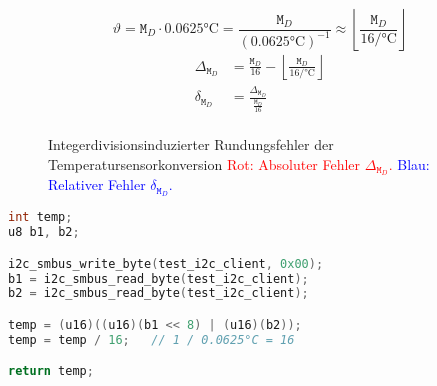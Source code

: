 \begin{equation}
    \vartheta = \texttt{M}_D \cdot 0.0625\si{\celsius} = \frac{\texttt{M}_D}{\left(0.0625\si{\celsius}\right)^{-1}} \approx \left\lfloor\frac{\texttt{M}_D}{16\si{\per\celsius}}\right\rfloor
    \label{eq:temp-convert}
\end{equation}
\begin{equation}
    \begin{aligned}
        \Delta_{\texttt{M}_D} &= \frac{\texttt{M}_D}{16} - \left\lfloor\frac{\texttt{M}_D}{16\si{\per\celsius}}\right\rfloor \\[2ex]
        \delta_{\texttt{M}_D} &= \frac{\Delta_{\texttt{M}_D}}{\frac{\texttt{M}_D}{16} } \\[2ex]
    \end{aligned}
    \label{eq:temp-error}
\end{equation}
\begin{figure}
    \centering
    \caption[Integerdivisionsinduzierter Rundungsfehler]{Integerdivisionsinduzierter Rundungsfehler der Temperatursensorkonversion
    \textcolor{red}{Rot: Absoluter Fehler $\Delta_{\texttt{M}_D}$.}
    \textcolor{blue}{Blau: Relativer Fehler $\delta_{\texttt{M}_D}$.}
    }
    \label{fig:rounding-err}
\end{figure}
\begin{lstlisting}[language=C, firstnumber=39]
int temp;
u8 b1, b2;

i2c_smbus_write_byte(test_i2c_client, 0x00);
b1 = i2c_smbus_read_byte(test_i2c_client);
b2 = i2c_smbus_read_byte(test_i2c_client);

temp = (u16)((u16)(b1 << 8) | (u16)(b2));
temp = temp / 16;	// 1 / 0.0625°C = 16

return temp;
\end{lstlisting}

